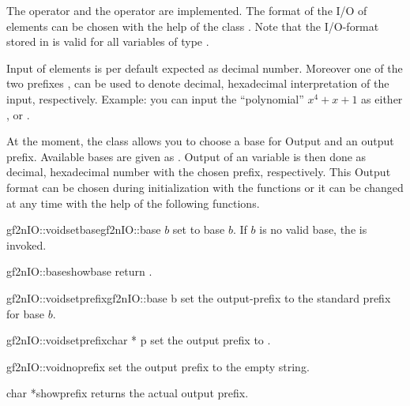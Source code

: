 
\IO

The  operator \code{>>} and the  operator \code{<<} are implemented.
The format of the I/O of  elements can be chosen with the help of the class
.  Note that the I/O-format stored in  is valid for all variables of
type .

Input of  elements is per default expected as decimal number.  Moreover one of the
two prefixes ,  can be used to denote decimal, hexadecimal interpretation
of the input, respectively.  Example: you can input the ``polynomial'' $x^4+x+1$ as either
,  or .

At the moment, the class  allows you to choose a base for Output and an output
prefix.  Available bases are given as .  Output of an 
variable is then done as decimal, hexadecimal number with the chosen prefix, respectively.  This
Output format can be chosen during initialization with the functions  or it can
be changed at any time with the help of the following functions.

\begin{fcode}{gf2nIO::void}{setbase}{gf2nIO::base $b$}
  set  to base $b$.  If $b$ is no valid base, the \LEH is invoked.
\end{fcode}

\begin{fcode}{gf2nIO::base}{showbase}{}
  return .
\end{fcode}

\begin{fcode}{gf2nIO::void}{setprefix}{gf2nIO::base b}
  set the output-prefix to the standard prefix for base $b$.
\end{fcode}

\begin{fcode}{gf2nIO::void}{setprefix}{char * p}
  set the output prefix to .
\end{fcode}

\begin{fcode}{gf2nIO::void}{noprefix}{}
  set the output prefix to the empty string.
\end{fcode}

\begin{fcode}{char *}{showprefix}{}
  returns the actual output prefix.
\end{fcode}


